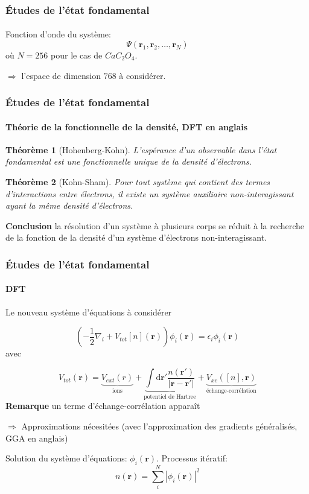 \documentclass[french]{beamer}
\newcommand{\vb}[1]{\mathbf{#1}}
\newcommand{\dd}[0]{\textrm{d}}
\newtheorem{theoreme}{Théorème}
\begin{document}
\begin{frame}
\frametitle{Études de l'état fondamental}
\framesubtitle{}
Fonction d'onde du système:
\begin{equation*}
  \Psi(\vb{r}_1, \vb{r}_2, \ldots, \vb{r}_N)
\end{equation*}
où $N=256$ pour le cas de $CaC_2O_4$.

$\Rightarrow $ l'espace de dimension $768$ à considérer.

\end{frame}
\newpage
\begin{frame}
\frametitle{Études de l'état fondamental}
\framesubtitle{Théorie de la fonctionnelle de la densité, DFT en anglais}
\begin{theoreme}[Hohenberg-Kohn]
  L'espérance d'un observable dans l'état fondamental est une fonctionnelle unique
  de la densité d'électrons.
\end{theoreme}

\begin{theoreme}[Kohn-Sham]
  Pour tout système qui contient des termes d'interactions entre électrons,
  il existe un système auxiliaire non-interagissant ayant la même densité d'électrons.
\end{theoreme}

\textbf{Conclusion} la résolution d'un système à plusieurs corps se réduit à la recherche de la fonction de la densité d'un système d'électrons non-interagissant.
\end{frame}
\newpage
\begin{frame}
\frametitle{Études de l'état fondamental}
\framesubtitle{DFT}
Le nouveau système d'équations à considérer

\begin{equation*}
  (-\frac{1}{2}\nabla_i + V_{tot}[n](\textbf{r}))\phi_i(\textbf{r}) = \epsilon_i\phi_i(\textbf{r})
\end{equation*}
avec

\begin{equation*}
  V_{tot}(\textbf{r}) = \underbrace{V_{ext}(r)}_\text{ions}
  + \underbrace{\int \dd \textbf{r}' \frac{n(\textbf{r}')}{|\textbf{r} - \textbf{r}'|}}_\text{potentiel de Hartree}
  + \underbrace{V_{xc}([n], \textbf{r})}_\text{échange-corrélation}
\end{equation*}
\textbf{Remarque} un terme d'échange-corrélation apparaît

$\Rightarrow$ Approximations nécesitées (avec l'approximation des gradients généralisés, GGA en anglais)

Solution du système d'équations: $\phi_i(\vb{r})$. Processus itératif:
\begin{equation*}
  n(\vb{r}) = \sum_i^N |\phi_i(\vb{r})|^2
\end{equation*}
\end{frame}
\end{document}

